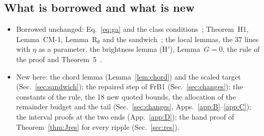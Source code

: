 \subsection{What is borrowed and what is new}
\begin{itemize}
\item Borrowed unchanged: Eq.~\eqref{eq:ga} and the class conditions~\cite{F}; Theorem~H1, Lemma~CM-1, Lemma~R$_\theta$ and the sandwich~\cite{H}; the local lemmas, the 37 lines with $\eta$ as a parameter, the brightness lemma (H$'$), Lemma~$G=0$, the rule of the proof and Theorem~5~\cite{I}.
\item New here: the chord lemma (Lemma~\ref{lem:chord}) and the scaled target (Sec.~\ref{sec:sandwich}); the repaired step of FrB1 (Sec.~\ref{sec:changes}); the constants of the rule, the 18 new quoted bounds, the allocation of the remainder budget and the tail (Sec.~\ref{sec:changes}, Apps.~\ref{app:B}--\ref{app:C}); the interval proofs at the two ends (App.~\ref{app:D}); the hand proof of Theorem~\ref{thm:Jres} for every ripple (Sec.~\ref{sec:res}).
\end{itemize}
